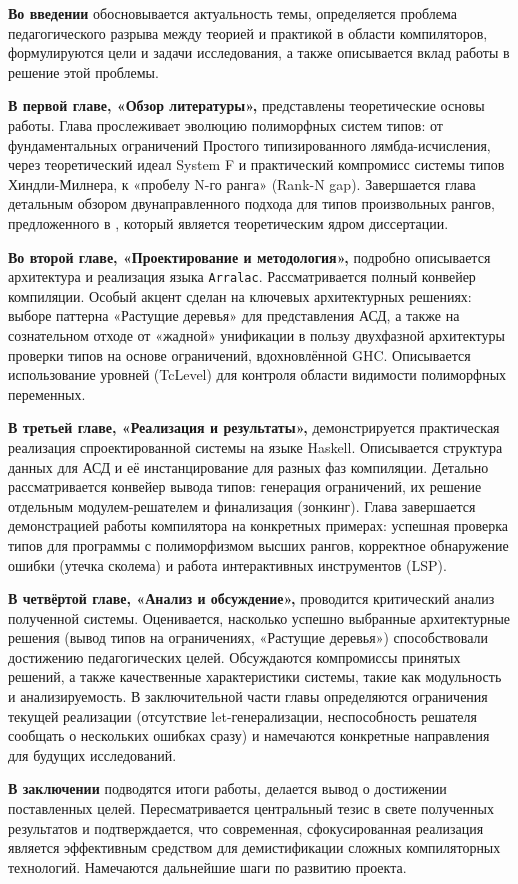 \textbf{Во введении} обосновывается актуальность темы, определяется проблема педагогического разрыва между теорией и практикой в области компиляторов, формулируются цели и задачи исследования, а также описывается вклад работы в решение этой проблемы.

\textbf{В первой главе, «Обзор литературы»,} представлены теоретические основы работы. Глава прослеживает эволюцию полиморфных систем типов: от фундаментальных ограничений Простого типизированного лямбда-исчисления, через теоретический идеал System F и практический компромисс системы типов Хиндли-Милнера, к «пробелу N-го ранга» (Rank-N gap). Завершается глава детальным обзором двунаправленного подхода для типов произвольных рангов, предложенного в \cite{jones-practical-2007}, который является теоретическим ядром диссертации.

\textbf{Во второй главе, «Проектирование и методология»,} подробно описывается архитектура и реализация языка \texttt{Arralac}. Рассматривается полный конвейер компиляции. Особый акцент сделан на ключевых архитектурных решениях: выборе паттерна «Растущие деревья» для представления АСД, а также на сознательном отходе от «жадной» унификации в пользу двухфазной архитектуры проверки типов на основе ограничений, вдохновлённой GHC. Описывается использование уровней (TcLevel) для контроля области видимости полиморфных переменных.

\textbf{В третьей главе, «Реализация и результаты»,} демонстрируется практическая реализация спроектированной системы на языке Haskell. Описывается структура данных для АСД и её инстанцирование для разных фаз компиляции. Детально рассматривается конвейер вывода типов: генерация ограничений, их решение отдельным модулем-решателем и финализация (зонкинг). Глава завершается демонстрацией работы компилятора на конкретных примерах: успешная проверка типов для программы с полиморфизмом высших рангов, корректное обнаружение ошибки (утечка сколема) и работа интерактивных инструментов (LSP).

\textbf{В четвёртой главе, «Анализ и обсуждение»,} проводится критический анализ полученной системы. Оценивается, насколько успешно выбранные архитектурные решения (вывод типов на ограничениях, «Растущие деревья») способствовали достижению педагогических целей. Обсуждаются компромиссы принятых решений, а также качественные характеристики системы, такие как модульность и анализируемость. В заключительной части главы определяются ограничения текущей реализации (отсутствие let-генерализации, неспособность решателя сообщать о нескольких ошибках сразу) и намечаются конкретные направления для будущих исследований.

\textbf{В заключении} подводятся итоги работы, делается вывод о достижении поставленных целей. Пересматривается центральный тезис в свете полученных результатов и подтверждается, что современная, сфокусированная реализация является эффективным средством для демистификации сложных компиляторных технологий. Намечаются дальнейшие шаги по развитию проекта.